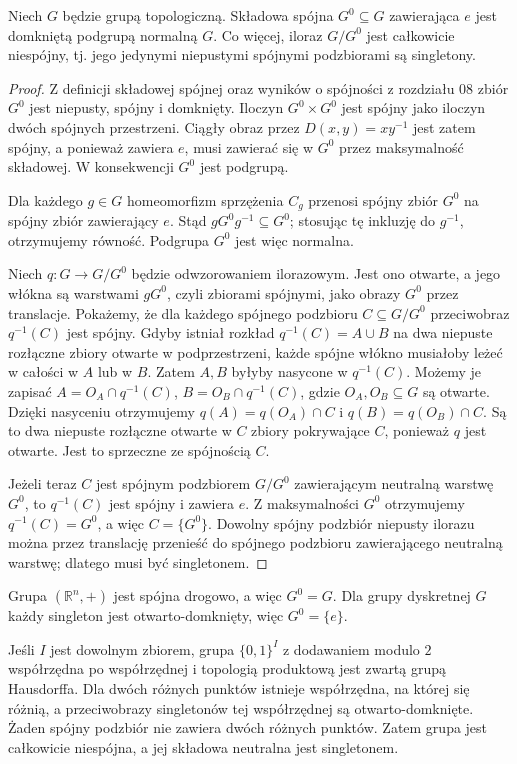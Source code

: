 \begin{twierdzenie}
\label{thm:topog24-identity-component}
Niech \(G\) będzie grupą topologiczną.
Składowa spójna \(G^0\subseteq G\)
zawierająca \(e\) jest domkniętą
podgrupą normalną \(G\).
Co więcej, iloraz \(G/G^0\)
jest całkowicie niespójny,
tj. jego jedynymi niepustymi
spójnymi podzbiorami są singletony.
\end{twierdzenie}
\begin{proof}
Z definicji składowej spójnej
oraz wyników o spójności z rozdziału 08
zbiór \(G^0\) jest niepusty,
spójny i domknięty.
Iloczyn \(G^0\times G^0\) jest spójny
jako iloczyn dwóch spójnych przestrzeni.
Ciągły obraz przez \(D(x,y)=xy^{-1}\)
jest zatem spójny, a ponieważ zawiera
\(e\), musi zawierać się w \(G^0\)
przez maksymalność składowej.
W konsekwencji \(G^0\) jest podgrupą.

Dla każdego \(g\in G\)
homeomorfizm sprzężenia \(C_g\)
przenosi spójny zbiór \(G^0\)
na spójny zbiór zawierający \(e\).
Stąd \(gG^0g^{-1}\subseteq G^0\);
stosując tę inkluzję do \(g^{-1}\),
otrzymujemy równość.
Podgrupa \(G^0\) jest więc normalna.

Niech \(q\colon G\to G/G^0\)
będzie odwzorowaniem ilorazowym.
Jest ono otwarte,
a jego włókna są warstwami \(gG^0\),
czyli zbiorami spójnymi,
jako obrazy \(G^0\) przez translacje.
Pokażemy, że dla każdego spójnego
podzbioru \(C\subseteq G/G^0\)
przeciwobraz \(q^{-1}(C)\) jest spójny.
Gdyby istniał rozkład
\(q^{-1}(C)=A\cup B\)
na dwa niepuste rozłączne zbiory
otwarte w podprzestrzeni,
każde spójne włókno musiałoby
leżeć w całości w \(A\) lub w \(B\).
Zatem \(A,B\) byłyby nasycone
w \(q^{-1}(C)\).
Możemy je zapisać
\(A=O_A\cap q^{-1}(C)\),
\(B=O_B\cap q^{-1}(C)\),
gdzie \(O_A,O_B\subseteq G\)
są otwarte. Dzięki nasyceniu
otrzymujemy
\(q(A)=q(O_A)\cap C\)
i \(q(B)=q(O_B)\cap C\).
Są to dwa niepuste rozłączne
otwarte w \(C\) zbiory pokrywające \(C\),
ponieważ \(q\) jest otwarte.
Jest to sprzeczne ze spójnością \(C\).

Jeżeli teraz \(C\) jest spójnym
podzbiorem \(G/G^0\) zawierającym
neutralną warstwę \(G^0\),
to \(q^{-1}(C)\) jest spójny
i zawiera \(e\).
Z maksymalności \(G^0\)
otrzymujemy \(q^{-1}(C)=G^0\),
a więc \(C=\{G^0\}\).
Dowolny spójny podzbiór niepusty
ilorazu można przez translację
przenieść do spójnego podzbioru
zawierającego neutralną warstwę;
dlatego musi być singletonem.
\end{proof}

\begin{przyklad}
\label{ex:topog24-components}
Grupa \((\mathbb R^n,+)\)
jest spójna drogowo, a więc \(G^0=G\).
Dla grupy dyskretnej \(G\)
każdy singleton jest otwarto-domknięty,
więc \(G^0=\{e\}\).

Jeśli \(I\) jest dowolnym zbiorem,
grupa \(\{0,1\}^I\) z dodawaniem
modulo \(2\) współrzędna po współrzędnej
i topologią produktową jest zwartą
grupą Hausdorffa.
Dla dwóch różnych punktów istnieje
współrzędna, na której się różnią,
a przeciwobrazy singletonów tej
współrzędnej są otwarto-domknięte.
Żaden spójny podzbiór nie zawiera
dwóch różnych punktów.
Zatem grupa jest całkowicie niespójna,
a jej składowa neutralna jest singletonem.
\end{przyklad}

